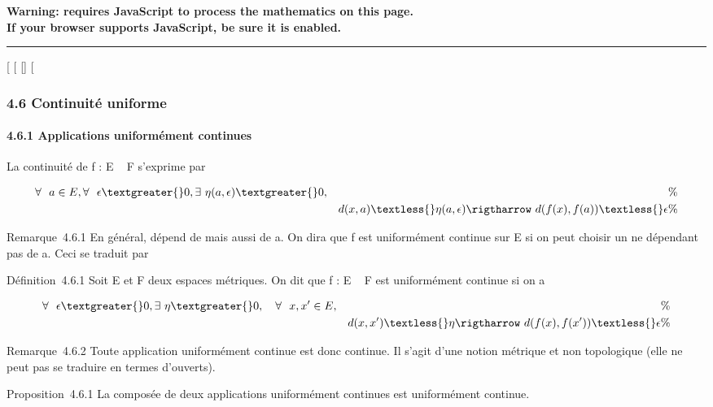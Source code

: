\textbf{Warning: 
requires JavaScript to process the mathematics on this page.\\ If your
browser supports JavaScript, be sure it is enabled.}

\begin{center}\rule{3in}{0.4pt}\end{center}

{[}
{[}
{[}{]}
{[}

\subsubsection{4.6 Continuité uniforme}

\paragraph{4.6.1 Applications uniformément continues}

La continuité de f : E \rightarrow~ F s'exprime par

\begin{align*} \forall~~a \in
E,\forall~~\epsilon \textgreater{} 0,
\exists~\eta(a,\epsilon) \textgreater{} 0,&& \%&
\\ & & d(x,a) \textless{} \eta(a,\epsilon) \rigtharrow~
d(f(x),f(a)) \textless{} \epsilon\%& \\
\end{align*}

Remarque~4.6.1 En général, \eta dépend de \epsilon mais aussi de a. On dira que f
est uniformément continue sur E si on peut choisir un \eta ne dépendant pas
de a. Ceci se traduit par

Définition~4.6.1 Soit E et F deux espaces métriques. On dit que f : E \rightarrow~
F est uniformément continue si on a

\begin{align*} \forall~~\epsilon
\textgreater{} 0,\exists~\eta \textgreater{}
0,\quad \forall~~x,x' \in E,&& \%&
\\ & & d(x,x') \textless{} \eta \rigtharrow~
d(f(x),f(x')) \textless{} \epsilon\%& \\
\end{align*}

Remarque~4.6.2 Toute application uniformément continue est donc
continue. Il s'agit d'une notion métrique et non topologique (elle ne
peut pas se traduire en termes d'ouverts).

Proposition~4.6.1 La composée de deux applications uniformément
continues est uniformément continue.

